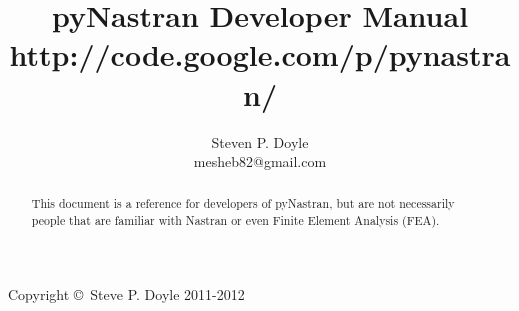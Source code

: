 \documentclass[a4paper,12pt]{article}
\begin{document}
\title{pyNastran Developer Manual \\
\small http://code.google.com/p/pynastran/ }
\author{Steven P. Doyle\\
{\small mesheb82@gmail.com}
}

\maketitle

\begin{abstract}
This document is a reference for developers of pyNastran, but are not
necessarily people that are familiar with Nastran or even Finite Element
Analysis (FEA).
\end{abstract}

Copyright \copyright\ Steve P. Doyle 2011-2012
\newpage

\tableofcontents
\newpage


\newpage

%

%
%


%
%
%
%

%
%
\end{document}
